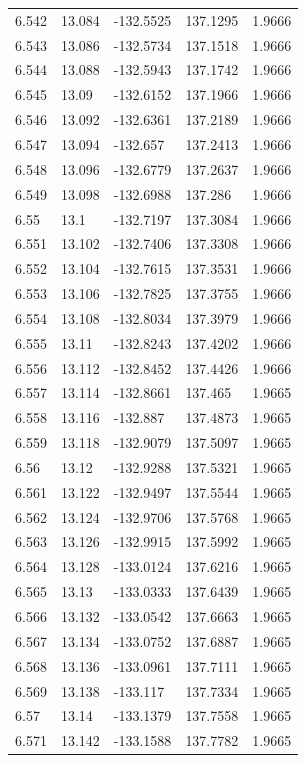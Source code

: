 \begin{tabular}{lllll}
6.542 & 13.084 & -132.5525 & 137.1295 & 1.9666 \\
6.543 & 13.086 & -132.5734 & 137.1518 & 1.9666 \\
6.544 & 13.088 & -132.5943 & 137.1742 & 1.9666 \\
6.545 & 13.09 & -132.6152 & 137.1966 & 1.9666 \\
6.546 & 13.092 & -132.6361 & 137.2189 & 1.9666 \\
6.547 & 13.094 & -132.657 & 137.2413 & 1.9666 \\
6.548 & 13.096 & -132.6779 & 137.2637 & 1.9666 \\
6.549 & 13.098 & -132.6988 & 137.286 & 1.9666 \\
6.55 & 13.1 & -132.7197 & 137.3084 & 1.9666 \\
6.551 & 13.102 & -132.7406 & 137.3308 & 1.9666 \\
6.552 & 13.104 & -132.7615 & 137.3531 & 1.9666 \\
6.553 & 13.106 & -132.7825 & 137.3755 & 1.9666 \\
6.554 & 13.108 & -132.8034 & 137.3979 & 1.9666 \\
6.555 & 13.11 & -132.8243 & 137.4202 & 1.9666 \\
6.556 & 13.112 & -132.8452 & 137.4426 & 1.9666 \\
6.557 & 13.114 & -132.8661 & 137.465 & 1.9665 \\
6.558 & 13.116 & -132.887 & 137.4873 & 1.9665 \\
6.559 & 13.118 & -132.9079 & 137.5097 & 1.9665 \\
6.56 & 13.12 & -132.9288 & 137.5321 & 1.9665 \\
6.561 & 13.122 & -132.9497 & 137.5544 & 1.9665 \\
6.562 & 13.124 & -132.9706 & 137.5768 & 1.9665 \\
6.563 & 13.126 & -132.9915 & 137.5992 & 1.9665 \\
6.564 & 13.128 & -133.0124 & 137.6216 & 1.9665 \\
6.565 & 13.13 & -133.0333 & 137.6439 & 1.9665 \\
6.566 & 13.132 & -133.0542 & 137.6663 & 1.9665 \\
6.567 & 13.134 & -133.0752 & 137.6887 & 1.9665 \\
6.568 & 13.136 & -133.0961 & 137.7111 & 1.9665 \\
6.569 & 13.138 & -133.117 & 137.7334 & 1.9665 \\
6.57 & 13.14 & -133.1379 & 137.7558 & 1.9665 \\
6.571 & 13.142 & -133.1588 & 137.7782 & 1.9665 \\

\end{tabular}
